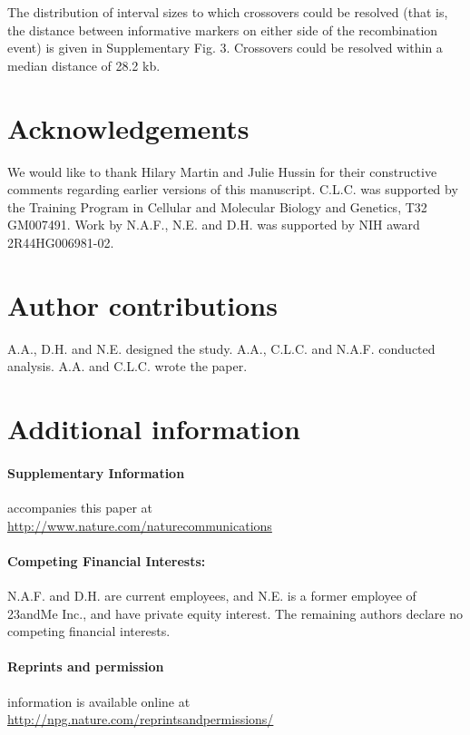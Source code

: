 The distribution of interval sizes to which crossovers could be resolved (that is,
the distance between informative markers on either side of the recombination
event) is given in Supplementary Fig. 3. Crossovers could be resolved within a
median distance of 28.2 kb.

\section{Acknowledgements}
We would like to thank Hilary Martin and Julie Hussin for their constructive comments
regarding earlier versions of this manuscript. C.L.C. was supported by the Training
Program in Cellular and Molecular Biology and Genetics, T32 GM007491. Work by
N.A.F., N.E. and D.H. was supported by NIH award 2R44HG006981-02.

\section{Author contributions}
A.A., D.H. and N.E. designed the study. A.A., C.L.C. and N.A.F. conducted analysis.
A.A. and C.L.C. wrote the paper.

\section{Additional information}

\paragraph{Supplementary Information} accompanies this paper at \\ \url{http://www.nature.com/naturecommunications}

\paragraph{Competing Financial Interests:} N.A.F. and D.H. are current employees, and N.E. is a
former employee of 23andMe Inc., and have private equity interest. The remaining
authors declare no competing financial interests.

\paragraph{Reprints and permission} information is available online at \\
\url{http://npg.nature.com/reprintsandpermissions/}

